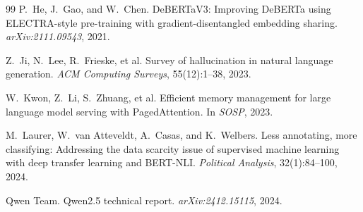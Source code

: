 \documentclass[11pt]{article}
\begin{document}
{\begin{thebibliography}{99}
P.~He, J.~Gao, and W.~Chen.
\newblock DeBERTaV3: Improving DeBERTa using ELECTRA-style pre-training with
gradient-disentangled embedding sharing.
\newblock \emph{arXiv:2111.09543}, 2021.

Z.~Ji, N.~Lee, R.~Frieske, et al.
\newblock Survey of hallucination in natural language generation.
\newblock \emph{ACM Computing Surveys}, 55(12):1--38, 2023.

W.~Kwon, Z.~Li, S.~Zhuang, et al.
\newblock Efficient memory management for large language model serving with
PagedAttention.
\newblock In \emph{SOSP}, 2023.

M.~Laurer, W.~van Atteveldt, A.~Casas, and K.~Welbers.
\newblock Less annotating, more classifying: Addressing the data scarcity issue
of supervised machine learning with deep transfer learning and BERT-NLI.
\newblock \emph{Political Analysis}, 32(1):84--100, 2024.

Qwen Team.
\newblock Qwen2.5 technical report.
\newblock \emph{arXiv:2412.15115}, 2024.

\end{thebibliography}
}
\end{document}
